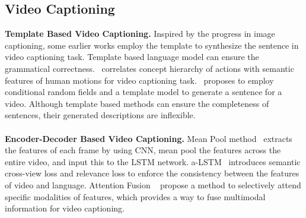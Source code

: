 \documentclass[a4paper,conference]{IEEEtran}
\begin{document}
\subsection{Video Captioning}
\noindent \textbf{Template Based Video Captioning.} Inspired by the progress in image captioning, some earlier works employ the template to synthesize the sentence in video captioning task. Template based language model can ensure the grammatical correctness.~\cite{kojima2002natural} correlates concept hierarchy of actions with semantic features of human motions for video captioning task.~\cite{rohrbach2013translating} proposes to employ conditional random fields and a template model to generate a sentence for a video. Although template based methods can ensure the completeness of sentences, their generated descriptions are inflexible.
\\
\\
\noindent \textbf{Encoder-Decoder Based Video Captioning.} 
Mean Pool method~\cite{venugopalan2014translating} extracts the features of each frame by using CNN, mean pool the features across the entire video, and input this to the LSTM network. a-LSTM~\cite{gao2017video} introduces semantic cross-view loss and relevance loss to enforce the consistency between the features of video and language. Attention Fusion ~\cite{hori2017attention} propose a  method to selectively attend specific modalities of features, which provides a way to fuse multimodal information for video captioning. %
\end{document}
